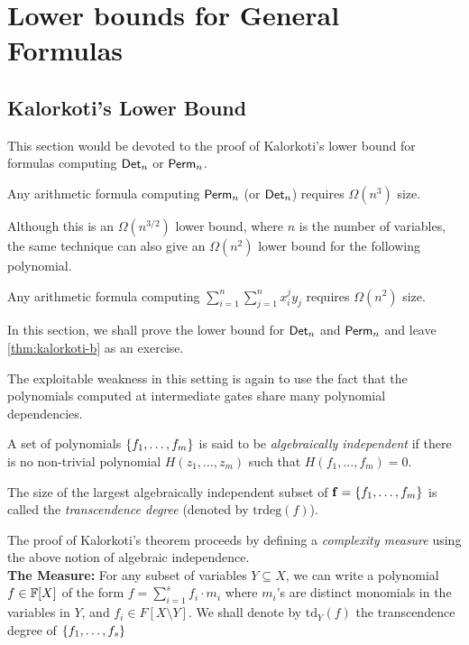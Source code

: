 \chapter{Lower bounds for General Formulas}\label{chap:gen-formulas}

\section{Kalorkoti's Lower Bound}\label{sec:Kalorkoti}

This section would be devoted to the proof of Kalorkoti's lower bound \cite{k85} for formulas computing $\operatorname{\mathsf{Det}}_n$ or $\operatorname{\mathsf{Perm}}_n$.

\begin{theorem}[\cite{k85}]\label{thm:kalorkoti}
  Any arithmetic formula computing $\operatorname{\mathsf{Perm}}_n$ (or $\operatorname{\mathsf{Det}}_n$) requires $\Omega(n^3)$ size.
\end{theorem}

Although this is an $\Omega(n^{3/2})$ lower bound, where $n$ is the number of variables, the same technique can also give an $\Omega(n^2)$ lower bound for the following polynomial.

\begin{theorem}[\cite{k85}]\label{thm:kalorkoti-b}
  Any arithmetic formula computing $\sum_{i=1}^n \sum_{j=1}^n x_i^j y_j$ requires $\Omega(n^2)$ size.
\end{theorem}

In this section, we shall prove the lower bound for $\operatorname{\mathsf{Det}}_n$ and $\operatorname{\mathsf{Perm}}_n$ and leave \autoref{thm:kalorkoti-b} as an exercise. 

The exploitable weakness in this setting is again to use the fact that the polynomials computed at intermediate gates share many polynomial dependencies.

\begin{definition}
  A set of polynomials $\left\{f_1,\dots, f_m\right\}$ is said to be \emph{algebraically independent} if there is no non-trivial polynomial $H(z_1,\dots, z_m)$ such that $H(f_1,\dots, f_m)=0$.

  The size of the largest algebraically independent subset of $\mathbf{f}=\left\{f_1,\dots, f_m\right\}$ is called the \emph{transcendence degree} (denoted by $\mathrm{trdeg}(f)$).
\end{definition}
The proof of Kalorkoti's theorem proceeds by defining a \emph{complexity measure} using the above notion of algebraic independence.
\\


{\bf The Measure:} 
For any subset of variables $Y\subseteq X$, we can write a polynomial $f \in \mathbb{F}[X]$ of the form $f = \sum_{i=1}^s f_i \cdot m_i$ where $m_i$'s are distinct monomials in the variables in $Y$, and $f_i \in F[X \setminus Y]$.
We shall denote by $\mathrm{td}_Y(f)$ the transcendence degree of $\left\{f_1,\dots, f_s\right\}$


